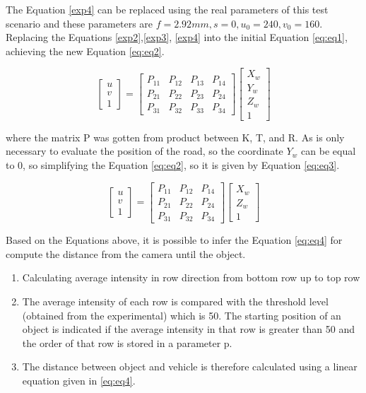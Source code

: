 The Equation \ref{exp4} can be replaced using the real parameters of this test scenario and these parameters are $f = 2.92 mm, s=0, u_0=240, v_0=160$. Replacing the Equations \ref{exp2},\ref{exp3}, \ref{exp4} into the initial Equation \ref{eq:eq1}, achieving the new Equation \ref{eq:eq2}.

\begin{equation}
    \begin{bmatrix}
u\\ 
v\\ 
1
\end{bmatrix}
=\begin{bmatrix}
P_{11} & P_{12} & P_{13} & P_{14}\\ 
P_{21} & P_{22} & P_{23} & P_{24}\\ 
P_{31} & P_{32} & P_{33} & P_{34}
\end{bmatrix}
\begin{bmatrix}
X_w\\ 
Y_w\\ 
Z_w\\
1
\end{bmatrix}
\label{eq:eq2}
\end{equation}

where the matrix P was gotten from product between K, T, and R. As is only necessary to evaluate the position of the road, so the coordinate $Y_w$ can be equal to 0, so simplifying the Equation \ref{eq:eq2}, so it is given by Equation \ref{eq:eq3}.

\begin{equation}
    \label{eq:eq3}
    \begin{bmatrix}
u\\ 
v\\ 
1
\end{bmatrix}
=\begin{bmatrix}
P_{11} & P_{12}  & P_{14}\\ 
P_{21} & P_{22}  & P_{24}\\ 
P_{31} & P_{32}  & P_{34}
\end{bmatrix}
\begin{bmatrix}
X_w\\ 
Z_w\\
1
\end{bmatrix}
\end{equation}

Based on the Equations above, it is possible to infer the Equation \ref{eq:eq4} for compute the distance from the camera until the object. 

\begin{enumerate}
    \item Calculating average intensity in row direction from bottom row up to top row
    \item The average intensity of each row is compared with the threshold level (obtained from the experimental) which is 50. The starting position of an object is indicated if the average intensity in that row is greater than 50 and the order of that row is stored in a parameter p.
    \item The distance between object and vehicle is therefore calculated using a linear equation given in \ref{eq:eq4}.
\end{enumerate}

